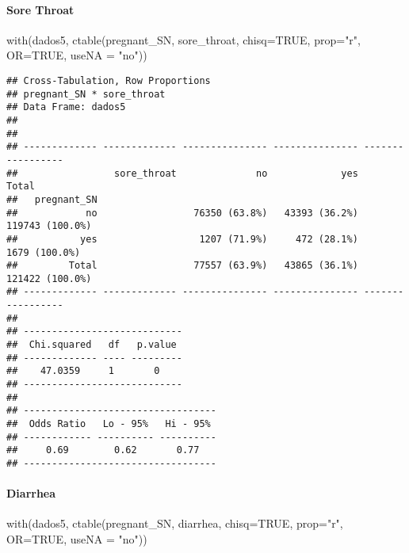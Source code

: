 \documentclass[
]{article}
\newenvironment{Shaded}{\begin{snugshade}}{\end{snugshade}}
\newcommand{\AttributeTok}[1]{\textcolor[rgb]{0.77,0.63,0.00}{#1}}
\newcommand{\ConstantTok}[1]{\textcolor[rgb]{0.00,0.00,0.00}{#1}}
\newcommand{\FunctionTok}[1]{\textcolor[rgb]{0.00,0.00,0.00}{#1}}
\newcommand{\NormalTok}[1]{#1}
\newcommand{\StringTok}[1]{\textcolor[rgb]{0.31,0.60,0.02}{#1}}
\begin{document}
\hypertarget{sore-throat}{%
\paragraph{\texorpdfstring{{ Sore Throat
}}{ Sore Throat }}\label{sore-throat}}

\begin{Shaded}
\begin{Highlighting}[]
\FunctionTok{with}\NormalTok{(dados5, }\FunctionTok{ctable}\NormalTok{(pregnant\_SN, sore\_throat, }\AttributeTok{chisq=}\ConstantTok{TRUE}\NormalTok{, }\AttributeTok{prop=}\StringTok{"r"}\NormalTok{, }\AttributeTok{OR=}\ConstantTok{TRUE}\NormalTok{, }\AttributeTok{useNA =} \StringTok{"no"}\NormalTok{))}
\end{Highlighting}
\end{Shaded}

\begin{verbatim}
## Cross-Tabulation, Row Proportions  
## pregnant_SN * sore_throat  
## Data Frame: dados5  
## 
## 
## ------------- ------------- --------------- --------------- -----------------
##                 sore_throat              no             yes             Total
##   pregnant_SN                                                                
##            no                 76350 (63.8%)   43393 (36.2%)   119743 (100.0%)
##           yes                  1207 (71.9%)     472 (28.1%)     1679 (100.0%)
##         Total                 77557 (63.9%)   43865 (36.1%)   121422 (100.0%)
## ------------- ------------- --------------- --------------- -----------------
## 
## ----------------------------
##  Chi.squared   df   p.value 
## ------------- ---- ---------
##    47.0359     1       0    
## ----------------------------
## 
## ----------------------------------
##  Odds Ratio   Lo - 95%   Hi - 95% 
## ------------ ---------- ----------
##     0.69        0.62       0.77   
## ----------------------------------
\end{verbatim}

\hypertarget{diarrhea}{%
\paragraph{\texorpdfstring{{ Diarrhea }}{ Diarrhea }}\label{diarrhea}}

\begin{Shaded}
\begin{Highlighting}[]
\FunctionTok{with}\NormalTok{(dados5, }\FunctionTok{ctable}\NormalTok{(pregnant\_SN, diarrhea, }\AttributeTok{chisq=}\ConstantTok{TRUE}\NormalTok{, }\AttributeTok{prop=}\StringTok{"r"}\NormalTok{, }\AttributeTok{OR=}\ConstantTok{TRUE}\NormalTok{, }\AttributeTok{useNA =} \StringTok{"no"}\NormalTok{))}
\end{Highlighting}
\end{Shaded}
\end{document}
